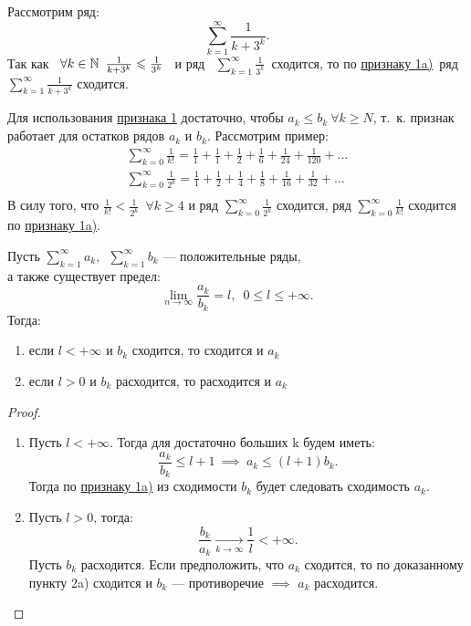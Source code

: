 \documentclass[../../main.tex]{subfiles}
\begin{document}
\begin{example}
	Рассмотрим ряд:
	\[
		 \sum\limits_{k = 1}^\infty\frac{1}{k + 3^k}
	.\]
	Так как \  $\forall k \in \mathbb{N} \enspace
	 \frac{1}{{k + 3^k}} \leqslant \frac{1}{3^k}$ \  и ряд 
	\ $\sum\limits_{k = 1}^\infty \frac{1}{3^k}$\   сходится,
	то по \hyperref[lec26:comp_test_1]{признаку  1\textdegree a)}\ ряд
	$ \sum\limits_{k = 1}^\infty\frac{1}{k + 3^k}$ сходится.
\end{example}
\begin{rem}
Для использования \hyperref[lec26:comp_test_1]{признака  1\textdegree} 
достаточно, чтобы $a_k \leq b_k\ \forall k\geq N$, т.~к.
признак работает для  остатков рядов $a_k$ и $b_k$. Рассмотрим пример:
\begin{gather*}
	\sum\limits_{k = 0}^\infty\frac{1}{k!} = \frac{1}{1} + 
	\frac{1}{1} +  \frac{1}{2} +  \frac{1}{6} +
	\frac{1}{24} +  \frac{1}{120} + \ldots\\
	\sum\limits_{k = 0}^\infty\frac{1}{2^k} = \frac{1}{1} + 
	\frac{1}{2} +  \frac{1}{4} +  \frac{1}{8} +
	\frac{1}{16} +  \frac{1}{32} + \ldots\\
\end{gather*}
	В силу того, что \enspace
	$\frac{1}{k!} < \frac{1}{2^k} \enspace \forall k \geq 4$
	\enspace и ряд $\sum\limits_{k = 0}^\infty\frac{1}{2^k}$ сходится,
	ряд $\sum\limits_{k = 0}^\infty\frac{1}{k!}$ сходится по
	 \hyperref[lec26:comp_test_1]{признаку  1\textdegree a)}.
 \end{rem}
  \begin{thm}
 	\label{lec26:comp_test_2}
 	Пусть $\sum\limits_{k = 1}^\infty a_k,
 	\enspace \sum\limits_{k = 1}^\infty b_k$
 	 --- положительные ряды,\\ 
 	а также существует предел:
 	\[
 	\lim\limits_{n \to \infty}\frac{a_k}{b_k} = l,\enspace 0 \leq l \leq +\infty
 	.\]
	Тогда:
	\begin{enumerate}[label={\alph*)}]
	\item если $l < +\infty$ и $b_k$ сходится, то сходится и $a_k$
	\item если $l > 0$ и $b_k$ расходится, то расходится и $a_k$
	\end{enumerate}
 \end{thm}
 \begin{proof}
	\begin{enumerate}[label={\alph*)}]
	\item Пусть $l< +\infty$.
	Тогда для достаточно больших k будем иметь:
	 \[
	 	\frac{a_k}{b_k} \leq l + 1 \  \implies \ a_k \leq (l+1)b_k
	 .\]
	Тогда по \hyperref[lec26:comp_test_1]{признаку  1\textdegree a)} из 
	 сходимости $b_k$ будет следовать сходимость $a_k$.
	\item Пусть $l > 0$, тогда:
	\[
	\frac{b_k}{a_k} \xrightarrow[k \to \infty]{} \frac{1}{l} < +\infty
	.\]
	Пусть $b_k$ расходится. Если предположить,
	что $a_k$  сходится, то по доказанному пункту
	2\textdegree a) сходится и $b_k$ --- противоречие 
	$\implies$ $a_k$ расходится.
	\end{enumerate}
\end{proof}
\end{document}
